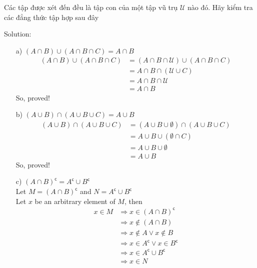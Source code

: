 \newpage
\begin{longfbox}
      \begin{bt} \label{pro:practice1.5}
            Các tập được xét đến đều là tập con của một tập vũ trụ $\mathcal U$ nào đó. Hãy kiểm tra các đẳng thức tập hợp sau đây
      \end{bt}
\end{longfbox}

Solution:
\begin{enumerate}
\item[a)] $(A\cap B)\cup(A\cap B\cap C) = A\cap B$ \\
      \begin{align}
            (A\cap B)\cup(A\cap B\cap C)
            &= (A\cap B\cap\mathcal U)\cup(A\cap B\cap C) \\
            &= A\cap B\cap (\mathcal U\cup C) \\
            &= A\cap B\cap\mathcal U \\
            &= A\cap B
      \end{align} 
      So, proved!
\item[b)] $(A\cup B)\cap(A\cup B\cup C) = A\cup B$ \\
      \begin{align}
            (A\cup B)\cap(A\cup B\cup C)
            &= (A\cup B\cup\emptyset)\cap(A\cup B\cup C) \\
            &= A\cup B\cup (\emptyset\cap C) \\
            &= A\cup B\cup\emptyset \\
            &= A\cup B
      \end{align} 
      So, proved!
\item[c)] $(A\cap B)^\mathsf{c} = A^\mathsf{c}\cup B^\mathsf{c}$ \\
      Let $M = (A\cap B)^\mathsf{c}$ and $N = A^\mathsf{c}\cup B^\mathsf{c}$ \\
      Let $x$ be an arbitrary element of $M$, then
      \begin{align}
            x\in M &\Rightarrow x\in(A\cap B)^\mathsf{c} \\
            &\Rightarrow x \notin (A \cap B) \\
            &\Rightarrow x \notin A \lor x \notin B \\
            &\Rightarrow x \in A^\mathsf{c} \lor x \in B^\mathsf{c} \\
            &\Rightarrow x \in A^\mathsf{c} \cup B^\mathsf{c} \\
            &\Rightarrow x \in N \\

\end{align}
\end{enumerate}
